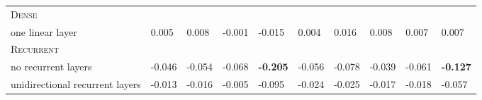 \begin{tabular}{llllllllll}
\hline
\textsc{Dense}            &                &                &                 &                 &                 &                 &                 &                 &                 \\
one linear layer                & 0.005          & 0.008          & -0.001          & -0.015          & 0.004           & 0.016           & 0.008           & 0.007           & 0.007           \\
\hline
\textsc{Recurrent}                    &                &                &                 & \textbf{}       &                 &                 &                 &                 & \textbf{}       \\
no recurrent layers             & -0.046         & -0.054         & -0.068          & \textbf{-0.205} & -0.056          & -0.078          & -0.039          & -0.061          & \textbf{-0.127} \\
unidirectional recurrent layers & -0.013         & -0.016         & -0.005          & -0.095          & -0.024          & -0.025          & -0.017          & -0.018          & -0.057         
\end{tabular}
